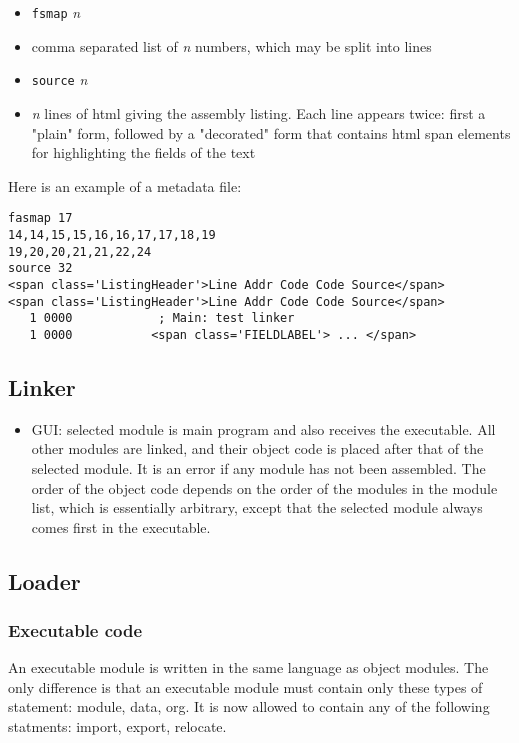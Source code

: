 \documentclass[11pt]{article}
\begin{document}
\begin{itemize}
\item \texttt{fsmap} \emph{n}
\item comma separated list of \emph{n} numbers, which may be split into lines
\item \texttt{source} \emph{n}
\item \emph{n} lines of html giving the assembly listing.  Each line appears
twice: first a "plain" form, followed by a "decorated" form that
contains html span elements for highlighting the fields of the text
\end{itemize}

Here is an example of a metadata file:

\begin{verbatim}
fasmap 17
14,14,15,15,16,16,17,17,18,19
19,20,20,21,21,22,24
source 32
<span class='ListingHeader'>Line Addr Code Code Source</span>
<span class='ListingHeader'>Line Addr Code Code Source</span>
   1 0000            ; Main: test linker
   1 0000           <span class='FIELDLABEL'> ... </span>
\end{verbatim}

\subsection*{Linker}
\label{sec:orgb186c81}
\begin{itemize}
\item GUI: selected module is main program and also receives the
executable.  All other modules are linked, and their object code is
placed after that of the selected module.  It is an error if any
module has not been assembled.  The order of the object code depends
on the order of the modules in the module list, which is essentially
arbitrary, except that the selected module always comes first in the
executable.
\end{itemize}

\subsection*{Loader}
\label{sec:orgfb0cead}
\subsubsection*{Executable code}
\label{sec:org852a9ee}

An executable module is written in the same language as object
modules.  The only difference is that an executable module must
contain only these types of statement: module, data, org.  It is now
allowed to contain any of the following statments: import, export,
relocate.
\end{document}
